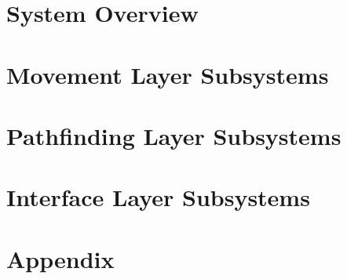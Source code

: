 \documentclass[11pt,letterpaper]{article}
\begin{document}
\section{System Overview}

\newpage
%
\newpage
\section{Movement Layer Subsystems}

\newpage
\section{Pathfinding Layer Subsystems}

\newpage
\section{Interface Layer Subsystems}

\clearpage
\section{Appendix}

\clearpage

% 

{}
\end{document}
